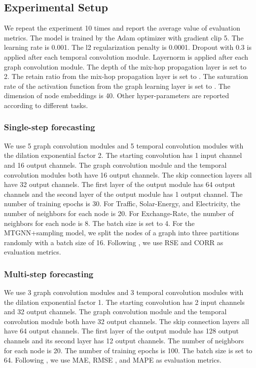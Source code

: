 \documentclass[sigconf]{acmart}
\begin{document}
\subsection{Experimental Setup}\label{sec:expsetup}
We repeat the experiment 10 times and report the average value of evaluation metrics. The model is trained by the Adam optimizer with gradient clip 5. The learning rate is 0.001. The l2 regularization penalty is 0.0001. Dropout with 0.3 is applied after each temporal convolution module. Layernorm is applied after each graph convolution module. The depth of the mix-hop propagation layer is set to 2. The retain ratio from the mix-hop propagation layer is set to . 
The saturation rate of the activation function from the graph learning layer is set to .
The dimension of node embeddings is 40. Other hyper-parameters are reported according to different tasks.  

\subsubsection{Single-step forecasting}
We use 5 graph convolution modules and 5 temporal convolution modules with the dilation exponential factor 2. The starting  convolution has 1 input channel and 16 output channels. The graph convolution module and the temporal convolution modules both have 16 output channels. The skip connection layers all have 32 output channels. The first layer of the output module has 64 output channels and the second layer of the output module has 1 output channel. The number of training epochs is 30. For Traffic, Solar-Energy, and Electricity, the number of neighbors for each node is 20. For Exchange-Rate, the number of neighbors for each node is 8. The batch size is set to 4.  For the MTGNN+sampling model, we split the nodes of a graph into three partitions randomly with a batch size of 16. Following \cite{lai2018modeling}, we use RSE and CORR as evaluation metrics.

\subsubsection{Multi-step forecasting}
We use 3 graph convolution modules and 3 temporal convolution modules with the dilation exponential factor 1. The starting  convolution has 2 input channels and 32 output channels. The graph convolution module and the temporal convolution module both have 32 output channels. The skip connection layers all have 64 output channels. The first layer of the output module has 128 output channels and its second layer has 12 output channels. The number of neighbors for each node is 20. The number of training epochs is 100. The batch size is set to 64. Following \cite{li2018diffusion}, we use MAE, RMSE , and MAPE as evaluation metrics.
\end{document}
